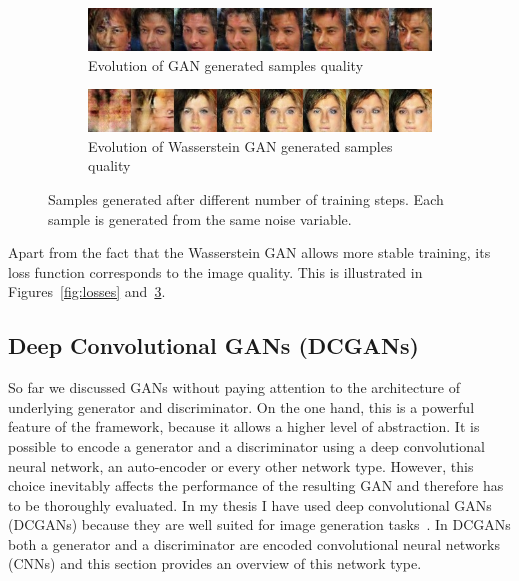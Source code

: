 \begin{figure}[h]
  \begin{subfigure}[b]{\textwidth}
    \includegraphics[width=\textwidth]{figures/gan_progress}
    \caption{Evolution of GAN generated samples quality}
    \label{fig:gan_evolution}
  \end{subfigure}
  \begin{subfigure}[b]{\textwidth}
    \includegraphics[width=\textwidth]{figures/wgan_progress}
    \caption{Evolution of Wasserstein GAN generated samples quality}
    \label{fig:gan_evolution}
  \end{subfigure}
  \caption{Samples generated after different number of training steps. Each sample is generated from the same noise variable.}
  \label{fig:samples_evolution}
\end{figure}

Apart from the fact that the Wasserstein GAN allows more stable training, its loss function corresponds to the image quality. This is illustrated in Figures~\ref{fig:losses} and~\ref{fig:samples_evolution}.



\subsection{Deep Convolutional GANs (DCGANs)}
So far we discussed GANs without paying attention to the architecture of underlying generator and discriminator. On the one hand, this is a powerful feature of the framework, because it allows a higher level of abstraction. It is possible to encode a generator and a discriminator using a deep convolutional neural network, an auto-encoder or every other network type. However, this choice inevitably affects the performance of the resulting GAN and therefore has to be thoroughly evaluated. In my thesis I have used deep convolutional GANs (DCGANs) because they are well suited for image generation tasks~\cite{dcgan}. In DCGANs both a generator and a discriminator are encoded convolutional neural networks (CNNs) and this section provides an overview of this network type. 

